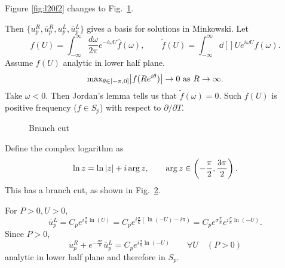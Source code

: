 Figure \ref{fig:l20f2} changes to Fig.~\ref{fig:l20f3}.
\begin{figure}[tbhp]
  \centering
  \def\svgwidth{0.7\columnwidth}
  
  \caption{}
  \label{fig:l20f3}
\end{figure}
Then $ \{u_p^R, \overline{u}{}_p^R, u_p^L, \overline{u}{}_p^L\} $ gives a basis for solutions in Minkowski.
Let
\begin{equation}
  f(U) = \int_{-\infty}^{\infty} \frac{d\omega}{2\pi} e^{-i \omega U} \hat{f}(\omega), \qquad 
  \widetilde{f}(U) = \int_{-\infty}^{\infty} \dd[]{U} e^{i \omega U} f(\omega).
\end{equation}
Assume $f(U)$ analytic in lower half plane. 
\begin{equation}
  \text{max}_{\theta \in [-\pi, 0]} \abs{f(R e^{i \theta})} \to 0 \text{ as } R \to \infty.
\end{equation}
Take $\omega < 0$. Then Jordan's lemma tells us that $\widetilde{f}(\omega) = 0$.
Such $f(U)$ is positive frequency ($f \in S_p$) with respect to $\partial / \partial T$.
\begin{figure}[tbph]
  \centering
  \begin{minipage}[t]{0.5\textwidth}
    \centering
    \caption{}
    \label{fig:l20f4}
  \end{minipage}%
  \begin{minipage}[t]{0.5\textwidth}
    \centering
    \caption{Branch cut}
    \label{fig:branch-cut}
  \end{minipage}
\end{figure}
Define the complex logarithm as
\begin{equation}
  \ln z = \ln \abs{z} + i \arg z, \qquad \arg z \in \left( -\frac{\pi}{2}, \frac{3\pi}{2} \right).
\end{equation}
This has a branch cut, as shown in Fig.~\ref{fig:branch-cut}.

For $P> 0, U > 0$,
\begin{equation}
  \overline{u}{}_p^L = C_p e^{i \frac{\sigma}{\kappa} \ln (U)} = C_p e^{i \frac{\sigma}{\kappa} (\ln (-U) -i \pi)} = C_p e^{\sigma \frac{\pi}{\kappa}} e^{i \frac{\sigma}{\kappa}\ln (-U)}.
\end{equation}
Since $P > 0$,
\begin{equation}
  u_p^R + e^{- \frac{\sigma \pi}{\kappa}} \overline{u}{}_p^L = C_p e^{i \frac{\sigma}{\kappa} \ln (-U)} \qquad \forall U \quad (P> 0)
\end{equation}
analytic in lower half plane and therefore in $S_p$.


